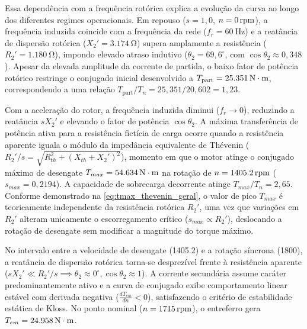 Essa dependência com a frequência rotórica explica a evolução da curva ao longo dos diferentes regimes operacionais. Em repouso ($s = 1{,}0$, $n = \SI{0}{\mathrm{rpm}}$), a frequência induzida coincide com a frequência da rede ($f_r = \SI{60}{\hertz}$) e a reatância de dispersão rotórica ($X_2' = \SI{3,174}{\ohm}$) supera amplamente a resistência ($R_2' = \SI{1,180}{\ohm}$), impondo elevado atraso indutivo ($\theta_2 = 69{,}6^\circ$, com $\cos\theta_2 \approx 0{,}348$). Apesar da elevada amplitude da corrente de partida, o baixo fator de potência rotórico restringe o conjugado inicial desenvolvido a $T_{\text{part}} = \SI{25,351}{\mathrm{N\cdot m}}$, correspondendo a uma relação $T_{\text{part}}/T_n = 25{,}351 / 20{,}602 = 1{,}23$.

Com a aceleração do rotor, a frequência induzida diminui ($f_r \to 0$), reduzindo a reatância $s X_2'$ e elevando o fator de potência $\cos\theta_2$. A máxima transferência de potência ativa para a resistência fictícia de carga ocorre quando a resistência aparente iguala o módulo da impedância equivalente de Thévenin ($R_2'/s = \sqrt{R_{th}^2 + (X_{th} + X_2')^2}$), momento em que o motor atinge o conjugado máximo de desengate $T_{max} = \SI{54,634}{\mathrm{N\cdot m}}$ na rotação de $n = \SI{1405,2}{\mathrm{rpm}}$ ($s_{max} = 0{,}2194$). A capacidade de sobrecarga decorrente atinge $T_{max}/T_n = 2{,}65$. Conforme demonstrado na \cref{eq:tmax_thevenin_geral}, o valor de pico $T_{max}$ é teoricamente independente da resistência rotórica $R_2'$, uma vez que variações em $R_2'$ alteram unicamente o escorregamento crítico ($s_{max} \propto R_2'$), deslocando a rotação de desengate sem modificar a magnitude do torque máximo.

No intervalo entre a velocidade de desengate (\SI{1405,2}{\RPM}) e a rotação síncrona (\SI{1800}{\RPM}), a reatância de dispersão rotórica torna-se desprezível frente à resistência aparente ($s X_2' \ll R_2'/s \implies \theta_2 \approx 0^\circ, \cos\theta_2 \approx 1$). A corrente secundária assume caráter predominantemente ativo e a curva de conjugado exibe comportamento linear estável com derivada negativa ($\frac{dT_{em}}{dn} < 0$), satisfazendo o critério de estabilidade estática de Kloss. No ponto nominal ($n = \SI{1715}{\mathrm{rpm}}$), o entreferro gera $T_{em} = \SI{24,958}{\mathrm{N\cdot m}}$.

